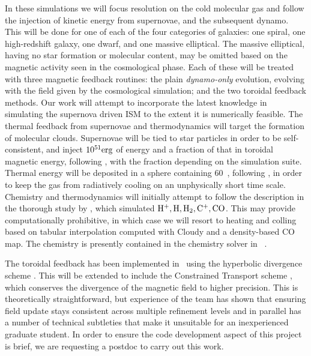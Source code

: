 In these simulations we will focus resolution on the cold molecular gas
and follow the injection of kinetic energy from supernovae, and the subsequent
dynamo. This will be done for one of each of the four categories of galaxies:
one spiral, one high-redshift galaxy, one dwarf, and one massive elliptical.  The
massive elliptical, having no star formation or molecular content, may be
omitted based on the magnetic activity seen in the cosmological phase. 
Each of these will be treated with three
magnetic feedback routines: the
plain \emph{dynamo-only} evolution, evolving with the field given by the
cosmological simulation; and the two toroidal feedback methods.  
Our work will attempt to incorporate the latest knowledge in simulating the
supernova driven ISM \citep[e.g.][]{Hill12, Shetty12b, Kim15b, Walch15, Padoan16} to the extent it is numerically feasible.  
The thermal
feedback from supernovae
and thermodynamics will target the formation of molecular clouds.  Supernovae
will be tied to star particles in order to be self-consistent, and inject
$10^{51}\rm{erg}$ of energy and a fraction of that in toroidal magnetic energy,
following \citep{Butsky17}, with the fraction depending on the simulation suite.
Thermal energy will be deposited in a sphere containing 60~\msun, following
\citep{Joung06, Hill12}, in order to keep the gas from radiatively cooling on
an unphysically short time scale.
Chemistry and thermodynamics will initially attempt to 
follow the description in the thorough study by \citep{Walch15}, which
simulated $\rm{H}^+, \rm{H}, \rm{H_2}, \rm{C^+}, \rm{CO}$.  This may provide
computationally prohibitive, in which case we will resort to heating and colling
based on tabular interpolation computed with Cloudy \citep{2014ApJS..211...19B, Ferland17}
and a density-based CO map.  
The chemistry is presently contained in the chemistry solver in \enzo\
\cite[see, e.g.,][]{Tasker11,2014ApJ...783...75M}.

The toroidal feedback has been implemented in \enzo\ using the hyperbolic
divergence scheme \citep{Dedner02}.  This will be extended to include the
Constrained Transport scheme \cite{Gardiner05, Collins10}, which conserves the divergence of the magnetic
field to higher precision.  This is theoretically straightforward, but
experience of the team has shown that ensuring field update stays consistent
across multiple refinement levels and in parallel has a number of technical
subtleties that make it unsuitable for an inexperienced graduate student.  In
order to ensure the code development aspect of this project is brief, we are
requesting a postdoc to carry out this work.  

